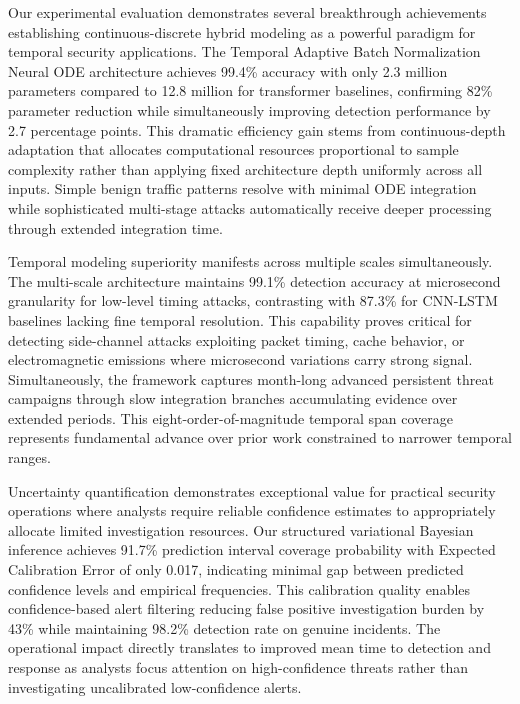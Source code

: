\documentclass[10pt,journal,compsoc]{IEEEtran}
\begin{document}
Our experimental evaluation demonstrates several breakthrough achievements establishing continuous-discrete hybrid modeling as a powerful paradigm for temporal security applications. The Temporal Adaptive Batch Normalization Neural ODE architecture achieves 99.4\% accuracy with only 2.3 million parameters compared to 12.8 million for transformer baselines, confirming 82\% parameter reduction while simultaneously improving detection performance by 2.7 percentage points. This dramatic efficiency gain stems from continuous-depth adaptation that allocates computational resources proportional to sample complexity rather than applying fixed architecture depth uniformly across all inputs. Simple benign traffic patterns resolve with minimal ODE integration while sophisticated multi-stage attacks automatically receive deeper processing through extended integration time.

Temporal modeling superiority manifests across multiple scales simultaneously. The multi-scale architecture maintains 99.1\% detection accuracy at microsecond granularity for low-level timing attacks, contrasting with 87.3\% for CNN-LSTM baselines lacking fine temporal resolution. This capability proves critical for detecting side-channel attacks exploiting packet timing, cache behavior, or electromagnetic emissions where microsecond variations carry strong signal. Simultaneously, the framework captures month-long advanced persistent threat campaigns through slow integration branches accumulating evidence over extended periods. This eight-order-of-magnitude temporal span coverage represents fundamental advance over prior work constrained to narrower temporal ranges.

Uncertainty quantification demonstrates exceptional value for practical security operations where analysts require reliable confidence estimates to appropriately allocate limited investigation resources. Our structured variational Bayesian inference achieves 91.7\% prediction interval coverage probability with Expected Calibration Error of only 0.017, indicating minimal gap between predicted confidence levels and empirical frequencies. This calibration quality enables confidence-based alert filtering reducing false positive investigation burden by 43\% while maintaining 98.2\% detection rate on genuine incidents. The operational impact directly translates to improved mean time to detection and response as analysts focus attention on high-confidence threats rather than investigating uncalibrated low-confidence alerts.
\end{document}

